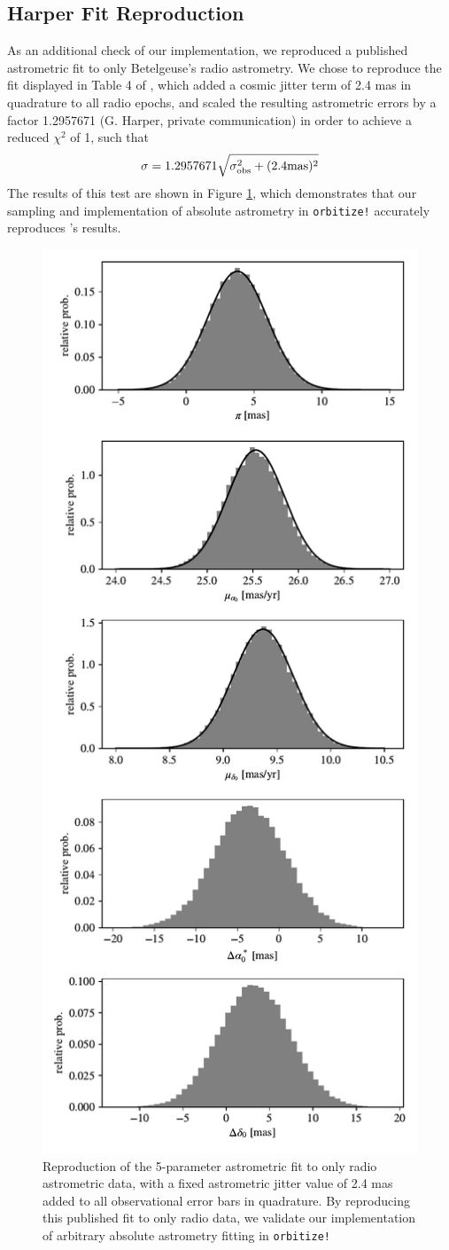 \documentclass[twocolumn]{aastex631}
\begin{document}
\subsection{Harper Fit Reproduction}\label{sec:harperreproduction}

As an additional check of our implementation, we reproduced a published astrometric fit to only Betelgeuse's radio astrometry. We chose to reproduce the fit displayed in Table 4 of \cite{2017AJ....154...11H}, which added a cosmic jitter term of 2.4 mas in quadrature to all radio epochs, and scaled the resulting astrometric errors by a factor 1.2957671 (G. Harper, private communication) in order to achieve a reduced $\chi^2$ of 1, such that 
\begin{equation}
    \sigma = 1.2957671 \sqrt{\sigma_{\rm obs}^2 + (2.4 \mathrm{mas})^2}
\end{equation}
The results of this test are shown in Figure \ref{fig:harper-reproduction}, which demonstrates that our sampling and implementation of absolute astrometry in {\tt orbitize!} accurately reproduces \citet{2017AJ....154...11H}'s results.



\begin{figure}
    \centering
    \includegraphics[width=0.3\linewidth]{figures/harper_compare.pdf}
    \caption{Reproduction of the \cite{2017AJ....154...11H} 5-parameter astrometric fit to only radio astrometric data, with a fixed astrometric jitter value of 2.4 mas added to all observational error bars in quadrature. By reproducing this published fit to only radio data, we validate our implementation of arbitrary absolute astrometry fitting in \texttt{orbitize!}}
    \label{fig:harper-reproduction}
\end{figure}
\end{document}
